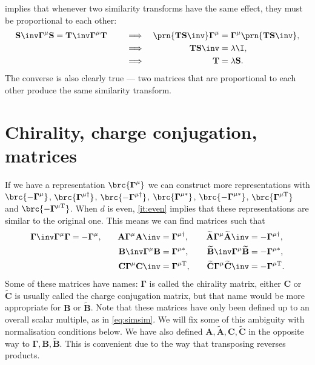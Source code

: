 \documentclass[11pt]{article}
\newcommand{\Gammab}{\boldsymbol{\Gamma}}
\newcommand{\mud}{{\mu\dag}}
\newcommand{\mut}{{\mu\mathrm{T}}}
\newcommand{\muc}{{\mu\ast}}
\renewcommand{\S}{\mathbf{S}}
\newcommand{\T}{\mathbf{T}}
\newcommand{\A}{\mathbf{A}}
\newcommand{\B}{\mathbf{B}}
\renewcommand{\C}{\mathbf{C}}
\newcommand{\At}{\widetilde{\mathbf{A}}}
\newcommand{\Bt}{\widetilde{\mathbf{B}}}
\newcommand{\Ct}{\widetilde{\mathbf{C}}}
\begin{document}
 implies that whenever two similarity transforms have the same effect, they must be proportional to each other:
%
\begin{equation}\label{eq:simsim}
  \S\inv \Gammab^\mu \S = \T\inv \Gammab^\mu \T
  \qquad
  \begin{aligned}[t]
     &\implies &
     \prn{\T \S\inv} \Gammab^\mu &= \Gammab^\mu \prn{\T \S\inv}, \\
     &\implies &
     \T \S\inv &= \lambda \I, \\
     &\implies &
     \T &= \lambda \S.
  \end{aligned}
\end{equation}
%
The converse is also clearly true --- two matrices that are proportional to each other produce the same similarity transform.


\section{Chirality, charge conjugation, \etc matrices}\label{sec:ccmats}


If we have a representation $\brc{\Gammab^\mu}$ we can construct more representations with $\brc{-\Gammab^\mu}$, $\brc{\Gammab^\mud}$, $\brc{-\Gammab^\mud}$, $\brc{\Gammab^\muc}$, $\brc{-\Gammab^\muc}$, $\brc{\Gammab^\mut}$ and $\brc{-\Gammab^\mut}$.
When $d$ is even, \cref{it:even} implies that these representations are similar to the original one.
This means we can find matrices such that
%
\begin{equation}\label{eq:cccmats}
\begin{aligned}
  \Gammab\inv \Gammab^\mu \Gammab &= -\Gammab^\mu, &\quad
  \A  \Gammab^\mu \A\inv  &=  \Gammab^\mud, &\quad
  \At \Gammab^\mu \At\inv &= -\Gammab^\mud, \\ &&
  \B\inv  \Gammab^\mu \B  &=  \Gammab^\muc, &
  \Bt\inv \Gammab^\mu \Bt &= -\Gammab^\muc, \\ &&
  \C  \Gammab^\mu \C\inv  &=  \Gammab^\mut, &
  \Ct \Gammab^\mu \Ct\inv &= -\Gammab^\mut.
\end{aligned}
\end{equation}
%
Some of these matrices have names: $\Gammab$ is called the chirality matrix, either $\C$ or $\Ct$ is usually called the charge conjugation matrix, but that name would be more appropriate for $\B$ or $\Bt$.
Note that these matrices have only been defined up to an overall scalar multiple, as in \cref{eq:simsim}.
We will fix some of this ambiguity with normalisation conditions below.
We have also defined $\A,\At,\C,\Ct$ in the opposite way to $\Gammab,\B,\Bt$.
This is convenient due to the way that transposing reverses products.
\end{document}
